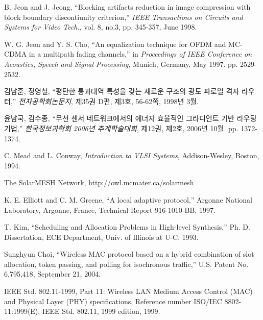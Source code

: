\documentclass[master,korean]{snuee}
\begin{document}
\begin{thebibliography}{00}

     B. Jeon and J. Jeong, ``Blocking artifacts
    reduction in image compression with block boundary discontiunity
    criterion,'' {\em IEEE Transactions on Circuits and Systems for
    Video Tech.}, vol. 8, no.3, pp. 345-357, June 1998.

     W. G. Jeon and Y. S. Cho, ``An equalization
    technique for OFDM and MC-CDMA in a multipath fading channels,''
    in {\em Proceedings of IEEE Conference on Acoustics, Speech and
    Signal Processing}, Munich, Germany, May 1997. pp. 2529-2532.

     김남훈, 정영철, ``평탄한 통과대역 특성을 갖는
    새로운 구조의 광도 파로열 격자 라우터,'' {\em 전자공학회논문지},
    제35권 D편, 제3호, 56-62쪽, 1998년 3월.

     윤남국, 김수종, ``무선 센서 네트워크에서의 에너지
    효율적인 그라디언트 기반 라우팅 기법,'' {\em 한국정보과학회
    2006년 추계학술대회}, 제12권, 제2호, 2006년 10월. pp.
    1372-1374.

     C. Mead and L. Conway, {\em Introduction to VLSI
    Systems}, Addison-Wesley, Boston, 1994.

     The SolarMESH Network,
    http://owl.mcmater.ca/solarmesh

     K. E. Elliott and C. M. Greene, ``A local adaptive
    protocol,'' Argonne National Laboratory, Argonne, France,
    Technical Report 916-1010-BB, 1997.

     T. Kim, ``Scheduling and Allocation Problems in
    High-level Synthesis,'' Ph. D. Dissertation, ECE Department,
    Univ. of Illinois at U-C, 1993.

     Sunghyun Choi, ``Wireless MAC protocol based on a
    hybrid combination of slot allocation, token passing, and
    polling for isochronous traffic,'' U.S. Patent No. 6,795,418,
    September 21, 2004.

     IEEE Std. 802.11-1999, Part 11: Wireless LAN
    Medium Access Control (MAC) and Physical Layer (PHY)
    specifications, Reference number ISO/IEC 8802-11:1999(E), IEEE
    Std. 802.11, 1999 edition, 1999.

\end{thebibliography}
\end{document}
